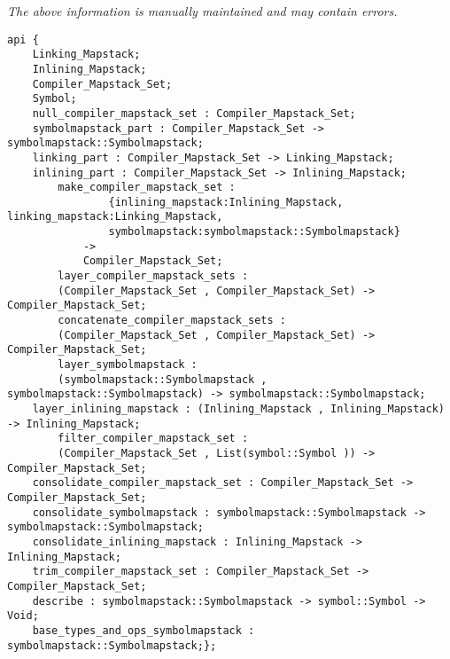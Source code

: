 \label{api:Compiler\_Mapstack\_Set}

{\tiny \it The above information is manually maintained and may contain errors.}
\begin{verbatim}
api {
    Linking_Mapstack;
    Inlining_Mapstack;
    Compiler_Mapstack_Set;
    Symbol;
    null_compiler_mapstack_set : Compiler_Mapstack_Set;
    symbolmapstack_part : Compiler_Mapstack_Set -> symbolmapstack::Symbolmapstack;
    linking_part : Compiler_Mapstack_Set -> Linking_Mapstack;
    inlining_part : Compiler_Mapstack_Set -> Inlining_Mapstack;
        make_compiler_mapstack_set :
                {inlining_mapstack:Inlining_Mapstack, linking_mapstack:Linking_Mapstack,
                symbolmapstack:symbolmapstack::Symbolmapstack}
            ->
            Compiler_Mapstack_Set;
        layer_compiler_mapstack_sets :
        (Compiler_Mapstack_Set , Compiler_Mapstack_Set) -> Compiler_Mapstack_Set;
        concatenate_compiler_mapstack_sets :
        (Compiler_Mapstack_Set , Compiler_Mapstack_Set) -> Compiler_Mapstack_Set;
        layer_symbolmapstack :
        (symbolmapstack::Symbolmapstack , symbolmapstack::Symbolmapstack) -> symbolmapstack::Symbolmapstack;
    layer_inlining_mapstack : (Inlining_Mapstack , Inlining_Mapstack) -> Inlining_Mapstack;
        filter_compiler_mapstack_set :
        (Compiler_Mapstack_Set , List(symbol::Symbol )) -> Compiler_Mapstack_Set;
    consolidate_compiler_mapstack_set : Compiler_Mapstack_Set -> Compiler_Mapstack_Set;
    consolidate_symbolmapstack : symbolmapstack::Symbolmapstack -> symbolmapstack::Symbolmapstack;
    consolidate_inlining_mapstack : Inlining_Mapstack -> Inlining_Mapstack;
    trim_compiler_mapstack_set : Compiler_Mapstack_Set -> Compiler_Mapstack_Set;
    describe : symbolmapstack::Symbolmapstack -> symbol::Symbol -> Void;
    base_types_and_ops_symbolmapstack : symbolmapstack::Symbolmapstack;};
\end{verbatim}
